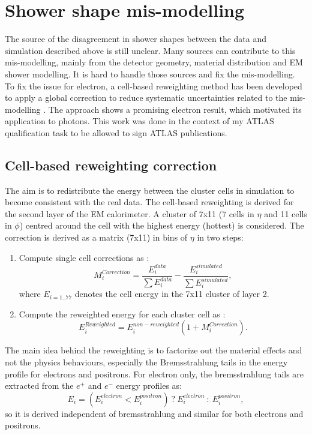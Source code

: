 \section{Shower shape mis-modelling}
\label{gamma:ss}
The source of the disagreement in shower shapes between the data and simulation described above is still unclear. Many sources can contribute to this mis-modelling, mainly from the detector geometry, material distribution and EM shower modelling. It is hard to handle those sources and fix the mis-modelling. To fix the issue for electron, a cell-based reweighting method has been developed to apply a global correction to reduce systematic uncertainties related to the mis-modelling \cite{xu, khandoga}. The approach shows a promising electron result, which motivated its application to photons. This work was done in the context of my ATLAS qualification task to be allowed to sign ATLAS publications.

\subsection{Cell-based reweighting correction}
\label{gamma:ss:reweighting}
The aim is to redistribute the energy between the cluster cells in simulation to become consistent with the real data. The cell-based reweighting is derived for the second layer of the EM calorimeter. A cluster of 7x11 (7 cells in $\eta$ and 11 cells in $\phi$) centred around the cell with the highest energy (hottest) is considered. The correction is derived as a matrix (7x11) in bins of $\eta$ in two steps:
\begin{enumerate}
    \item Compute single cell corrections as : 
    \begin{equation}
        M_{i}^{Correction} = \frac{E_{i}^{data}}{\sum E_{i}^{data}} -  \frac{E_{i}^{simulated}}{\sum E_{i}^{simulated}},
    \end{equation}
    where $E_{i = 1.. 77}$ denotes the cell energy in the 7x11 cluster of layer 2. 
    \item Compute the reweighted energy for each cluster cell as : 
    \begin{equation}
        E_{i}^{Reweighted} = E_{i}^{non-reweighted}(1+M_{i}^{Correction}).
    \end{equation}
\end{enumerate}
The main idea behind the reweighting is to factorize out the material effects and not the physics behaviours, especially the Bremsstrahlung tails in the energy profile for electrons and positrons. For electron only, the bremsstrahlung tails are extracted from the $e^+$ and $e^-$ energy profiles as: 
\begin{equation}
    E_{i} = (E_{i}^{electron} <  E_{i}^{positron}) \ ? \ E_{i}^{electron} \ : \  E_{i}^{positron},
\end{equation}
so it is derived independent of bremsstrahlung and similar for both electrons and positrons.

